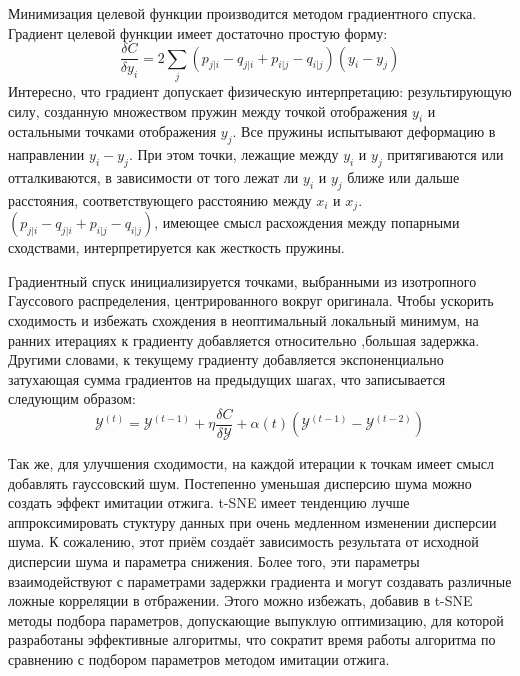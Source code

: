 Минимизация целевой функции производится методом градиентного спуска. Градиент целевой функции имеет достаточно простую форму:
\begin{equation}
	\frac{\delta C}{\delta y_i} = 2 \sum_j (p_{j|i} - q_{j|i} + p_{i|j} - q_{i|j})(y_i - y_j)
\end{equation}
Интересно, что градиент допускает физическую интерпретацию: результирующую силу, созданную множеством пружин между точкой отображения $y_i$ и остальными точками отображения $y_j$. Все пружины испытывают деформацию в направлении $y_i - y_j$. При этом точки, лежащие между $y_i$ и $y_j$ притягиваются или отталкиваются, в зависимости от того лежат ли $y_i$ и $y_j$ ближе или дальше расстояния, соответствующего расстоянию между $x_i$ и $x_j$. $(p_{j|i} - q_{j|i} + p_{i|j} - q_{i|j})$, имеющее смысл расхождения между попарными сходствами, интерпретируется как жесткость пружины. 

Градиентный спуск инициализируется точками, выбранными из изотропного Гауссового распределения, центрированного вокруг оригинала. Чтобы ускорить сходимость и избежать схождения в неоптимальный локальный минимум, на ранних итерациях к градиенту добавляется относительно ,большая задержка. Другими словами, к текущему градиенту добавляется экспоненциально затухающая сумма градиентов на предыдущих шагах, что записывается следующим образом:
\begin{equation}
	\mathcal{Y}^{(t)} = \mathcal{Y}^{(t-1)} + \eta \frac{\delta C}{\delta \mathcal{Y}} + \alpha(t) (\mathcal{Y}^{(t-1)} - \mathcal{Y}^{(t-2)})
\end{equation}

Так же, для улучшения сходимости, на каждой итерации к точкам имеет смысл добавлять гауссовский шум. Постепенно уменьшая дисперсию шума можно создать эффект имитации отжига. t-SNE имеет тенденцию лучше аппроксимировать стуктуру данных при очень медленном изменении дисперсии шума. К сожалению, этот приём создаёт зависимость результата от исходной дисперсии шума и параметра снижения. Более того, эти параметры взаимодействуют с параметрами задержки градиента и могут создавать различные ложные корреляции в отбражении. Этого можно избежать, добавив в t-SNE методы подбора параметров, допускающие выпуклую оптимизацию, для которой разработаны эффективные алгоритмы, что сократит время работы алгоритма по сравнению с подбором параметров методом имитации отжига.

